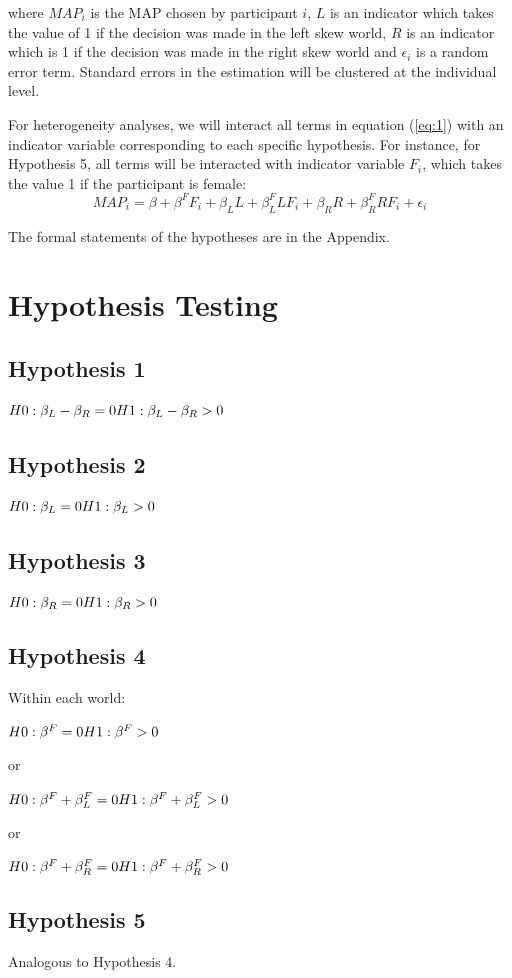 \noindent where $MAP_i$ is the MAP chosen by participant $i$, $L$ is an indicator which takes the value of 1 if the decision was made in the left skew world, $R$ is an indicator which is 1 if the decision was made in the right skew world and $\epsilon_i$ is a random error term.
Standard errors in the estimation will be clustered at the individual level.

For heterogeneity analyses, we will interact all terms in equation (\ref{eq:1}) with an indicator variable corresponding to each specific hypothesis.
For instance, for Hypothesis 5, all terms will be interacted with indicator variable $F_i$, which takes the value 1 if the participant is female:
\begin{equation} \label{eq:2}
MAP_i = \beta + \beta^F F_i + \beta_L L + \beta_L^F L F_i + \beta_R R + \beta_R^F R F_i + \epsilon_i
\end{equation}

The formal statements of the hypotheses are in the Appendix.

\clearpage
\pagebreak



\clearpage
\pagebreak

\appendix
\section{Hypothesis Testing}
\label{section:appendixa}
\setcounter{figure}{0}
\setcounter{table}{0}
\renewcommand{\thefigure}{A.\arabic{figure}}
\renewcommand{\thetable}{A.\arabic{table}}

\subsection{Hypothesis 1}
$H0: \beta_L - \beta_R = 0 \\
H1: \beta_L - \beta_R > 0$

\subsection{Hypothesis 2}
$H0: \beta_L = 0 \\
H1: \beta_L > 0$

\subsection{Hypothesis 3}
$H0: \beta_R = 0 \\
H1: \beta_R > 0$

\subsection{Hypothesis 4}
Within each world:

\noindent $H0: \beta^F = 0 \\
H1: \beta^F > 0$

\noindent or

\noindent $H0: \beta^F + \beta_L^F = 0 \\
H1: \beta^F + \beta_L^F > 0$

\noindent or

\noindent $H0: \beta^F + \beta_R^F = 0 \\
H1: \beta^F + \beta_R^F > 0$

\subsection{Hypothesis 5}
Analogous to Hypothesis 4.

